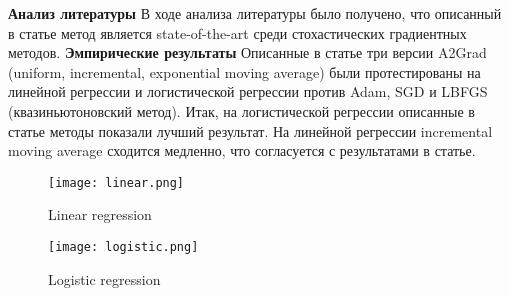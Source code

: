 \documentclass[oneside,final,12pt]{article}
\begin{document}
\break\noindent\textbf{\Large{Анализ литературы}}\newline\break
В ходе анализа литературы было получено, что описанный в статье метод является state-of-the-art среди стохастических градиентных методов.\newline
\break\noindent\textbf{\Large{Эмпирические результаты}}\newline\break
Описанные в статье три версии A2Grad (uniform, incremental, exponential moving average)  были протестированы на линейной регрессии и логистической регрессии против Adam, SGD и LBFGS (квазиньютоновский метод). Итак, на логистической регрессии описанные в статье методы показали лучший результат. На линейной регрессии incremental moving average сходится медленно, что согласуется с результатами в статье.
\begin{figure}[h!]
    \centering
    \texttt{[image: linear.png]}
    \caption{Linear regression}
    \label{fig:lin}
\end{figure}
\begin{figure}[h!]
    \centering
    \texttt{[image: logistic.png]}
    \caption{Logistic regression}
    \label{fig:log}
\end{figure}
\end{document}

